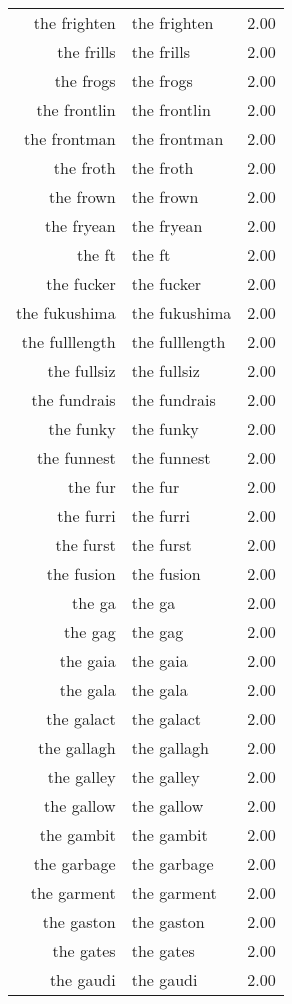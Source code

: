 \begin{table}[ht]
\begin{tabular}{rlr}
  the frighten & the frighten & 2.00 \\ 
  the frills & the frills & 2.00 \\ 
  the frogs & the frogs & 2.00 \\ 
  the frontlin & the frontlin & 2.00 \\ 
  the frontman & the frontman & 2.00 \\ 
  the froth & the froth & 2.00 \\ 
  the frown & the frown & 2.00 \\ 
  the fryean & the fryean & 2.00 \\ 
  the ft & the ft & 2.00 \\ 
  the fucker & the fucker & 2.00 \\ 
  the fukushima & the fukushima & 2.00 \\ 
  the fulllength & the fulllength & 2.00 \\ 
  the fullsiz & the fullsiz & 2.00 \\ 
  the fundrais & the fundrais & 2.00 \\ 
  the funky & the funky & 2.00 \\ 
  the funnest & the funnest & 2.00 \\ 
  the fur & the fur & 2.00 \\ 
  the furri & the furri & 2.00 \\ 
  the furst & the furst & 2.00 \\ 
  the fusion & the fusion & 2.00 \\ 
  the ga & the ga & 2.00 \\ 
  the gag & the gag & 2.00 \\ 
  the gaia & the gaia & 2.00 \\ 
  the gala & the gala & 2.00 \\ 
  the galact & the galact & 2.00 \\ 
  the gallagh & the gallagh & 2.00 \\ 
  the galley & the galley & 2.00 \\ 
  the gallow & the gallow & 2.00 \\ 
  the gambit & the gambit & 2.00 \\ 
  the garbage & the garbage & 2.00 \\ 
  the garment & the garment & 2.00 \\ 
  the gaston & the gaston & 2.00 \\ 
  the gates & the gates & 2.00 \\ 
  the gaudi & the gaudi & 2.00 \\ 

\end{tabular}
\end{table}
